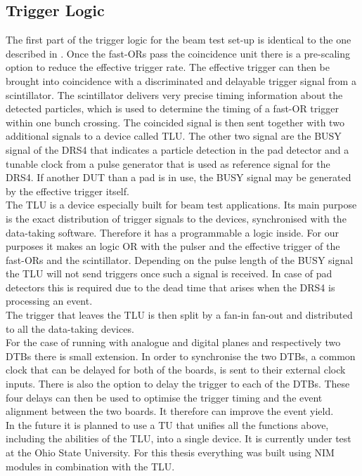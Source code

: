 \documentclass[british,11pt,a4paper]{memoir}
\begin{document}
\subsection{Trigger Logic}
The first part of the trigger logic for the beam test set-up is identical to the one described in . Once the fast-ORs pass the coincidence unit there is a pre-scaling option to reduce the effective trigger rate. The effective trigger can then be brought into coincidence with a discriminated and delayable trigger signal from a scintillator. The scintillator delivers very precise timing information about the detected particles, which is used to determine the timing of a fast-OR trigger within one bunch crossing. The coincided signal is then sent together with two additional signals to a device called \ac{TLU}. The other two signal are the BUSY signal of the DRS4 that indicates a particle detection in the pad detector and a tunable clock from a pulse generator that is used as reference signal for the DRS4. If another \ac{DUT} than a pad is in use, the BUSY signal may be generated by the effective trigger itself.\\
The \ac{TLU} is a device especially built for beam test applications. Its main purpose is the exact distribution of trigger signals to the devices, synchronised with the data-taking software. Therefore it has a programmable a logic inside. For our purposes it makes an logic OR with the pulser and the effective trigger of the fast-ORs and the scintillator. Depending on the pulse length of the BUSY signal the \ac{TLU} will not send triggers once such a signal is received. In case of pad detectors this is required due to the dead time that arises when the DRS4 is processing an event.\\
The trigger that leaves the \ac{TLU} is then split by a fan-in fan-out and distributed to all the data-taking devices. \\
For the case of running with analogue and digital planes and respectively two \ac{DTB}s there is small extension. In order to synchronise the two \ac{DTB}s, a common clock that can be delayed for both of the boards, is sent to their external clock inputs. There is also the option to delay the trigger to each of the \ac{DTB}s. These four delays can then be used to optimise the trigger timing and the event alignment between the two boards. It therefore can improve the event yield.\\
In the future it is planned to use a \ac{TU} that unifies all the functions above, including the abilities of the \ac{TLU}, into a single device. It is currently under test at the Ohio State University. For this thesis everything was built using NIM modules in combination with the \ac{TLU}.
\end{document}
